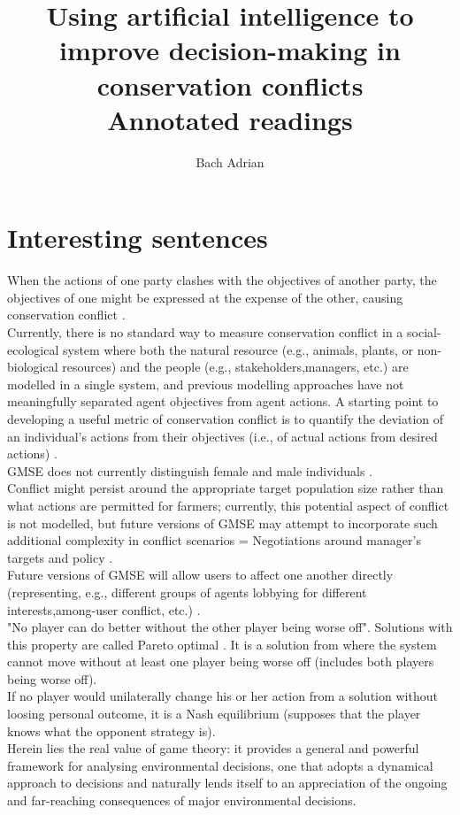 \documentclass[12pt]{article}
\title{Using artificial intelligence to improve decision-making in conservation conflicts \\\medskip Annotated readings}
\author{Bach Adrian}
\begin{document}
\maketitle

\tableofcontents

\section*{Interesting sentences}
When  the  actions  of  one  party  clashes  with  the  objectives  of  another  party,  the  objectives of  one  might  be  expressed  at  the  expense  of  the  other,  causing  conservation  conflict \citep{duthie2018}.\\
Currently,  there  is  no  standard  way  to  measure  conservation  conflict  in  a  social-ecological  system  where  both the  natural  resource  (e.g.,  animals,  plants,  or  non-biological  resources)  and  the  people  (e.g.,  stakeholders,managers,  etc.)  are  modelled  in  a  single  system,  and  previous  modelling  approaches  have  not  meaningfully separated  agent  objectives  from  agent  actions. A  starting  point  to  developing  a  useful  metric of  conservation  conflict  is  to  quantify  the  deviation  of  an  individual’s  actions  from  their  objectives  (i.e.,  of actual  actions  from  desired  actions) \citep{duthie2018}.\\
GMSE  does  not  currently distinguish  female  and  male  individuals \citep{duthie2018}.\\
Conflict  might  persist  around  the  appropriate  target  population  size  rather  than  what actions  are  permitted  for  farmers;  currently,  this  potential  aspect  of  conflict  is  not  modelled,  but  future versions  of  GMSE  may  attempt  to  incorporate  such  additional  complexity  in  conflict  scenarios = Negotiations around manager's targets and policy \citep{duthie2018}.\\
Future  versions  of  GMSE  will  allow  users  to affect  one  another  directly  (representing,  e.g.,  different  groups  of  agents  lobbying  for  different  interests,among-user  conflict,  etc.) \citep{duthie2018}.\\
"No player can do better without the other player being worse off". Solutions with this property are called Pareto optimal \citep{COLYVAN20111246}. It is a solution from where the system cannot move without at least one player being worse off (includes both players being worse off).\\
If no player would unilaterally change his or her action from a solution without loosing personal outcome, it is a Nash equilibrium (supposes that the player knows what the opponent strategy is).\\
Herein lies
the real value of game theory: it provides a general and powerful
framework for analysing environmental decisions, one that
adopts a dynamical approach to decisions and naturally lends itself to an appreciation of the ongoing and far-reaching consequences of major environmental decisions. \citep{COLYVAN20111246}\\
\end{document}
